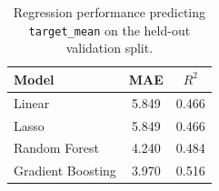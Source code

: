 \begin{table}[h]
\centering
\begin{tabular}{lcc}
\toprule
Model & MAE & $R^2$ \\
\midrule
Linear & 5.849 & 0.466 \\
Lasso & 5.849 & 0.466 \\
Random Forest & 4.240 & 0.484 \\
Gradient Boosting & 3.970 & 0.516 \\
\bottomrule
\end{tabular}
\caption{Regression performance predicting \texttt{target\_mean} on the held-out validation split.}
\label{tab:regression_results}
\end{table}
